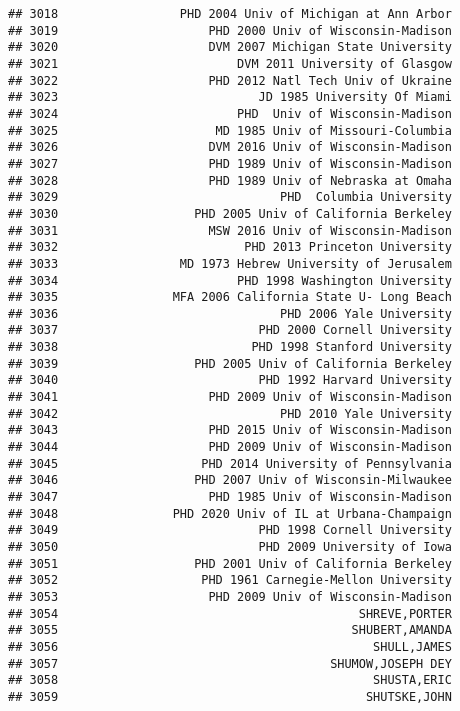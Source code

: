 \documentclass[
]{article}
\begin{document}
\begin{verbatim}
## 3018                 PHD 2004 Univ of Michigan at Ann Arbor
## 3019                     PHD 2000 Univ of Wisconsin-Madison
## 3020                     DVM 2007 Michigan State University
## 3021                         DVM 2011 University of Glasgow
## 3022                     PHD 2012 Natl Tech Univ of Ukraine
## 3023                            JD 1985 University Of Miami
## 3024                         PHD  Univ of Wisconsin-Madison
## 3025                      MD 1985 Univ of Missouri-Columbia
## 3026                     DVM 2016 Univ of Wisconsin-Madison
## 3027                     PHD 1989 Univ of Wisconsin-Madison
## 3028                     PHD 1989 Univ of Nebraska at Omaha
## 3029                               PHD  Columbia University
## 3030                   PHD 2005 Univ of California Berkeley
## 3031                     MSW 2016 Univ of Wisconsin-Madison
## 3032                          PHD 2013 Princeton University
## 3033                 MD 1973 Hebrew University of Jerusalem
## 3034                         PHD 1998 Washington University
## 3035                MFA 2006 California State U- Long Beach
## 3036                               PHD 2006 Yale University
## 3037                            PHD 2000 Cornell University
## 3038                           PHD 1998 Stanford University
## 3039                   PHD 2005 Univ of California Berkeley
## 3040                            PHD 1992 Harvard University
## 3041                     PHD 2009 Univ of Wisconsin-Madison
## 3042                               PHD 2010 Yale University
## 3043                     PHD 2015 Univ of Wisconsin-Madison
## 3044                     PHD 2009 Univ of Wisconsin-Madison
## 3045                    PHD 2014 University of Pennsylvania
## 3046                   PHD 2007 Univ of Wisconsin-Milwaukee
## 3047                     PHD 1985 Univ of Wisconsin-Madison
## 3048                PHD 2020 Univ of IL at Urbana-Champaign
## 3049                            PHD 1998 Cornell University
## 3050                            PHD 2009 University of Iowa
## 3051                   PHD 2001 Univ of California Berkeley
## 3052                    PHD 1961 Carnegie-Mellon University
## 3053                     PHD 2009 Univ of Wisconsin-Madison
## 3054                                          SHREVE,PORTER
## 3055                                         SHUBERT,AMANDA
## 3056                                            SHULL,JAMES
## 3057                                      SHUMOW,JOSEPH DEY
## 3058                                            SHUSTA,ERIC
## 3059                                           SHUTSKE,JOHN

\end{verbatim}
\end{document}
